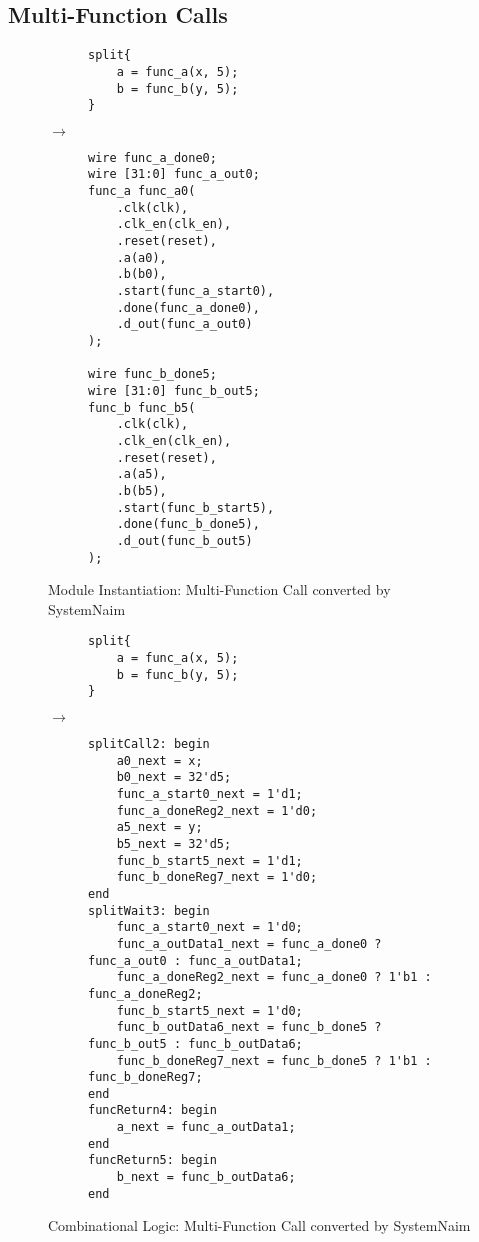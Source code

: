 \subsection{Multi-Function Calls}


\begin{figure}[H]
\centering
\begin{subfigure}{0.32\textwidth}
    \centering
    \begin{verbatim}
split{
    a = func_a(x, 5);
    b = func_b(y, 5);
}
\end{verbatim}
\end{subfigure}%
{\LARGE$\rightarrow$}%
\begin{subfigure}{0.45\textwidth}
    \begin{verbatim}
wire func_a_done0;
wire [31:0] func_a_out0;
func_a func_a0(
    .clk(clk),
    .clk_en(clk_en),
    .reset(reset),
    .a(a0),
    .b(b0),
    .start(func_a_start0),
    .done(func_a_done0),
    .d_out(func_a_out0)
);

wire func_b_done5;
wire [31:0] func_b_out5;
func_b func_b5(
    .clk(clk),
    .clk_en(clk_en),
    .reset(reset),
    .a(a5),
    .b(b5),
    .start(func_b_start5),
    .done(func_b_done5),
    .d_out(func_b_out5)
);
    \end{verbatim}
\end{subfigure}
\caption{Module Instantiation: Multi-Function Call converted by SystemNaim}
\label{sn:multi_func_call_mdl}
\end{figure}


\begin{figure}[H]
\centering
\begin{subfigure}{0.32\textwidth}
    \centering
    \begin{verbatim}
split{
    a = func_a(x, 5);
    b = func_b(y, 5);
}
\end{verbatim}
\end{subfigure}%
{\LARGE$\rightarrow$}%
\begin{subfigure}{0.58\textwidth}
    \begin{verbatim}
splitCall2: begin
    a0_next = x;
    b0_next = 32'd5;
    func_a_start0_next = 1'd1;
    func_a_doneReg2_next = 1'd0;
    a5_next = y;
    b5_next = 32'd5;
    func_b_start5_next = 1'd1;
    func_b_doneReg7_next = 1'd0;
end
splitWait3: begin
    func_a_start0_next = 1'd0;
    func_a_outData1_next = func_a_done0 ? func_a_out0 : func_a_outData1;
    func_a_doneReg2_next = func_a_done0 ? 1'b1 : func_a_doneReg2;
    func_b_start5_next = 1'd0;
    func_b_outData6_next = func_b_done5 ? func_b_out5 : func_b_outData6;
    func_b_doneReg7_next = func_b_done5 ? 1'b1 : func_b_doneReg7;
end
funcReturn4: begin
    a_next = func_a_outData1;
end
funcReturn5: begin
    b_next = func_b_outData6;
end
    \end{verbatim}
\end{subfigure}
\caption{Combinational Logic: Multi-Function Call converted by SystemNaim}
\label{sn:multi_func_call_comb}
\end{figure}

